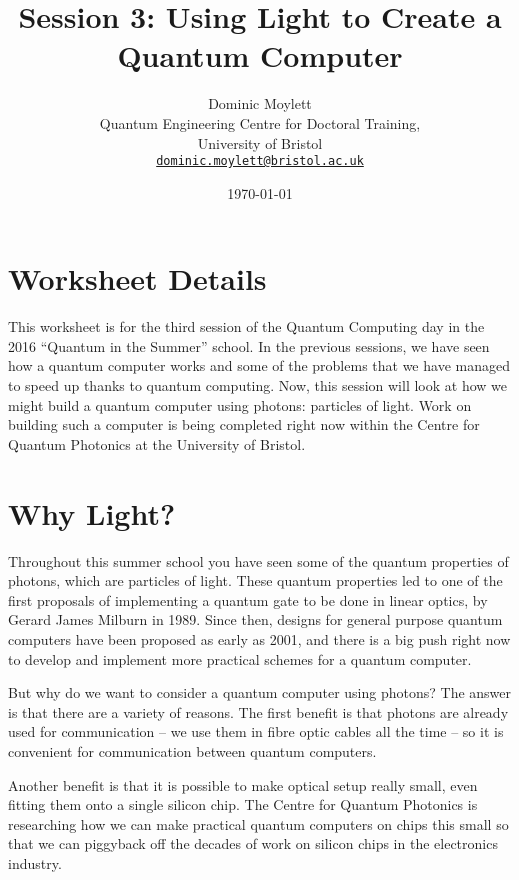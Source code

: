 \documentclass[twocolumn]{article}
\begin{document}
\lstset{style=Style1}

\title{Session 3: Using Light to Create a Quantum Computer}
\author{Dominic Moylett\\
        	Quantum Engineering Centre for Doctoral Training,\\
		University of Bristol\\
		\texttt{\href{mailto:dominic.moylett@bristol.ac.uk}{dominic.moylett@bristol.ac.uk}}
		}
\date{\today}
\maketitle

\section*{Worksheet Details}

This worksheet is for the third session of the Quantum Computing day in the 2016 ``Quantum in the Summer'' school. In the previous sessions, we have seen how a quantum computer works and some of the problems that we have managed to speed up thanks to quantum computing. Now, this session will look at how we might build a quantum computer using photons: particles of light. Work on building such a computer is being completed right now within the Centre for Quantum Photonics at the University of Bristol.

\section{Why Light?}
\label{sec:why}

Throughout this summer school you have seen some of the quantum properties of photons, which are particles of light. These quantum properties led to one of the first proposals of implementing a quantum gate to be done in linear optics, by Gerard James Milburn in 1989. Since then, designs for general purpose quantum computers have been proposed as early as 2001, and there is a big push right now to develop and implement more practical schemes for a quantum computer.

But why do we want to consider a quantum computer using photons? The answer is that there are a variety of reasons. The first benefit is that photons are already used for communication -- we use them in fibre optic cables all the time -- so it is convenient for communication between quantum computers.

Another benefit is that it is possible to make optical setup really small, even fitting them onto a single silicon chip. The Centre for Quantum Photonics is researching how we can make practical quantum computers on chips this small so that we can piggyback off the decades of work on silicon chips in the electronics industry.
\end{document}
